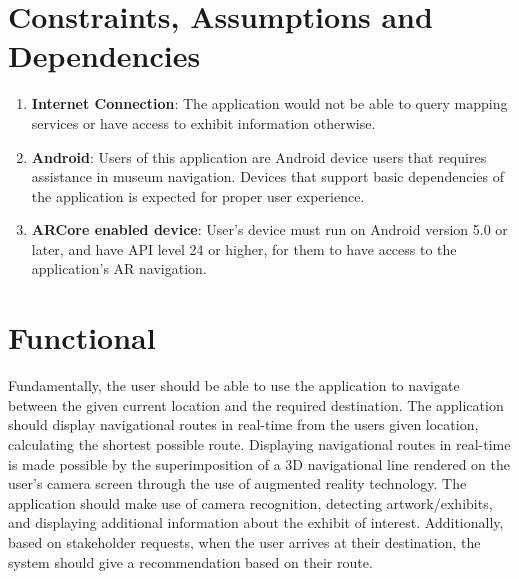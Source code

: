 \section*{Constraints, Assumptions and Dependencies}
\begin{enumerate}
    \item \textbf{Internet Connection}: The application would not be able to query mapping services or have access to exhibit information otherwise.

    \item \textbf{Android}: Users of this application are Android device users that requires assistance in museum navigation. Devices that support basic dependencies of the application is expected for proper user experience.

    \item \textbf{ARCore enabled device}: User's device must run on Android version 5.0 or later, and have API level 24 or higher, for them to have  access to the application's AR navigation.
\end{enumerate}

\section{Functional}
Fundamentally, the user should be able to use the application to navigate between the given current location and the required destination. The application should display navigational routes in real-time from the users given location, calculating the shortest possible route. Displaying navigational routes in real-time is made possible by the superimposition of a 3D navigational line rendered on the user's camera screen through the use of augmented reality technology. The application should make use of camera recognition, detecting artwork/exhibits, and displaying additional information about the exhibit of interest. Additionally, based on stakeholder requests, when the user arrives at their destination, the system should give a recommendation based on their route.


